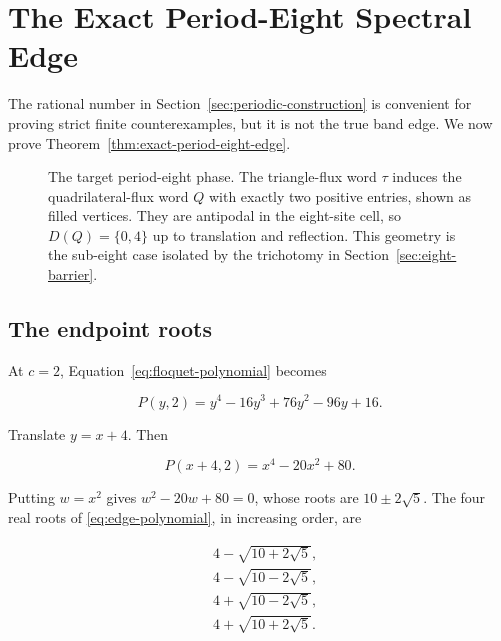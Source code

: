 \section{The Exact Period-Eight Spectral Edge}\label{sec:period-eight-edge}

The rational number in Section~\ref{sec:periodic-construction} is convenient for proving strict finite
counterexamples, but it is not the true band edge. We now prove Theorem~\ref{thm:exact-period-eight-edge}.

\begin{figure}[H]
\centering

\caption{The target period-eight phase. The triangle-flux word \(\tau\) induces
the quadrilateral-flux word \(Q\) with exactly two positive entries, shown as
filled vertices. They are antipodal in the eight-site cell, so
\(D(Q)=\{0,4\}\) up to translation and reflection. This geometry is the
sub-eight case isolated by the trichotomy in Section~\ref{sec:eight-barrier}.}
\label{fig:period8-target}
\end{figure}

\subsection{The endpoint roots}

At \(c=2\), Equation~\eqref{eq:floquet-polynomial} becomes

\begin{equation}
\label{eq:edge-polynomial}
P(y,2)=y^{4}-16y^{3}+76y^{2}-96y+16.
\end{equation}

Translate \(y=x+4\). Then

\begin{equation}
\label{eq:edge-depressed-quartic}
P(x+4,2)=x^{4}-20x^{2}+80.
\end{equation}

Putting \(w=x^{2}\) gives \(w^{2}-20w+80=0\), whose roots are
\(10\pm2\sqrt{5}\). The four real roots of \eqref{eq:edge-polynomial}, in increasing order, are

\begin{equation}
\label{eq:edge-four-roots}
\begin{aligned}
&4-\sqrt{10+2\sqrt{5}}, \\
&4-\sqrt{10-2\sqrt{5}}, \\
&4+\sqrt{10-2\sqrt{5}}, \\
&4+\sqrt{10+2\sqrt{5}}.
\end{aligned}
\end{equation}

